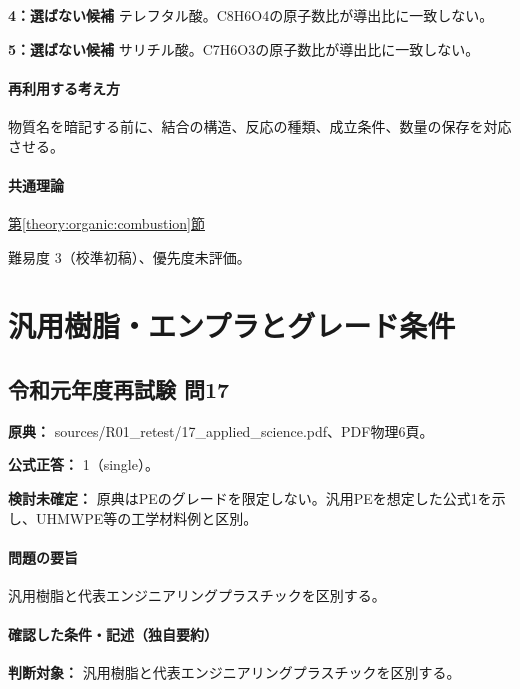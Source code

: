 \noindent\textbf{4：選ばない候補} テレフタル酸。C8H6O4の原子数比が導出比に一致しない。\par

\noindent\textbf{5：選ばない候補} サリチル酸。C7H6O3の原子数比が導出比に一致しない。\par

\paragraph{再利用する考え方} 物質名を暗記する前に、結合の構造、反応の種類、成立条件、数量の保存を対応させる。

\paragraph{共通理論} \hyperref[theory:organic:combustion]{第\ref*{theory:organic:combustion}節}

\par 難易度 3（校準初稿）、優先度未評価。

\section{汎用樹脂・エンプラとグレード条件}

\subsection{令和元年度再試験 問17}
\label{q:r01-ret-applied-17}

\noindent\textbf{原典：} sources/R01\_retest/17\_applied\_science.pdf、PDF物理6頁。

\textbf{公式正答：} 1（single）。

\par\textbf{検討未確定：} 原典はPEのグレードを限定しない。汎用PEを想定した公式1を示し、UHMWPE等の工学材料例と区別。

\paragraph{問題の要旨} 汎用樹脂と代表エンジニアリングプラスチックを区別する。

\paragraph{確認した条件・記述（独自要約）}\mbox{}\par

\noindent\textbf{判断対象：} 汎用樹脂と代表エンジニアリングプラスチックを区別する。\par

